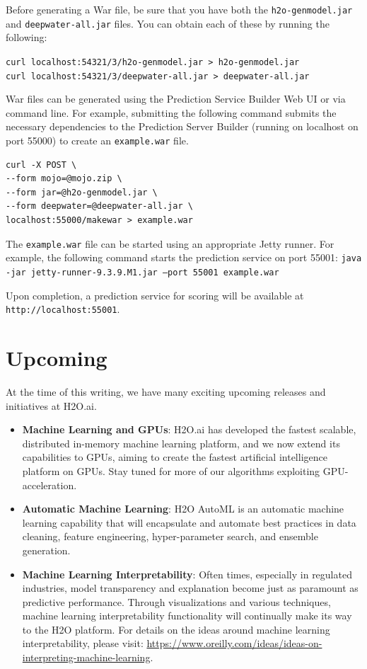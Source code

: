 		Before generating a War file, be sure that you have both the \texttt{h2o-genmodel.jar} and \texttt{deepwater-all.jar} files. You can obtain each of these by running the following:
		
\texttt{\small{curl localhost:54321/3/h2o-genmodel.jar > h2o-genmodel.jar}}\\
\texttt{\small{curl localhost:54321/3/deepwater-all.jar > deepwater-all.jar}}


		War files can be generated using the Prediction Service Builder Web UI or via command line.  For example, submitting the following command submits the necessary dependencies to the Prediction Server Builder (running on localhost on port 55000) to create an \texttt{example.war} file.

\begin{verbatim}
curl -X POST \
--form mojo=@mojo.zip \
--form jar=@h2o-genmodel.jar \
--form deepwater=@deepwater-all.jar \
localhost:55000/makewar > example.war
\end{verbatim}

		The \texttt{example.war} file can be started using an appropriate Jetty runner.  For example, the following command starts the prediction service on port 55001: 
    		\small{\texttt{java -jar jetty-runner-9.3.9.M1.jar --port 55001 example.war}} 
		
		Upon completion, a prediction service for scoring will be available at \\
		{\texttt{http://localhost:55001}}.


\section{Upcoming}
At the time of this writing, we have many exciting upcoming releases and initiatives at H2O.ai.
	\begin{itemize}
		\item{\textbf{Machine Learning and GPUs}}: H2O.ai has developed the fastest scalable, distributed in-memory machine learning platform, and we now extend its capabilities to GPUs, aiming to create the fastest artificial intelligence platform on GPUs.  Stay tuned for more of our algorithms exploiting GPU-acceleration.
		\item{\textbf{Automatic Machine Learning}}: H2O AutoML is an automatic machine learning capability that will encapsulate and automate best practices in data cleaning, feature engineering, hyper-parameter search, and ensemble generation.
		\item{\textbf{Machine Learning Interpretability}}: Often times, especially in regulated industries, model transparency and explanation become just as paramount as predictive performance.  Through visualizations and various techniques, machine learning interpretability functionality will continually make its way to the H2O platform.  For details on the ideas around machine learning interpretability, please visit: {\url{https://www.oreilly.com/ideas/ideas-on-interpreting-machine-learning}}.
	\end{itemize}

